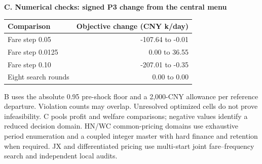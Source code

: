 \begin{table}[htbp]
\begin{minipage}{.95\textwidth}
\par\noindent\textbf{C. Numerical checks: signed P3 change from the central menu}\par\smallskip
\begin{tabular*}{\linewidth}{@{\extracolsep{\fill}}lr@{}}\toprule
Comparison & Objective change (CNY k/day) \\
\midrule
Fare step 0.05 & -107.64 to -0.01 \\
Fare step 0.0125 & 0.00 to 36.55 \\
Fare step 0.10 & -207.01 to -0.35 \\
Eight search rounds & 0.00 to 0.00 \\
\bottomrule\end{tabular*}\par\medskip
\par\noindent\fontsize{8}{9.5}\selectfont B uses the absolute 0.95 pre-shock floor and a 2,000-CNY allowance per reference departure. Violation counts may overlap. Unresolved optimized cells do not prove infeasibility. C pools profit and welfare comparisons; negative values identify a reduced decision domain. HN/WC common-pricing domains use exhaustive period enumeration and a coupled integer master with hard finance and retention when required. JX and differentiated pricing use multi-start joint fare--frequency search and independent local audits.
\end{minipage}\end{table}
